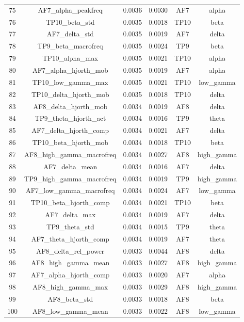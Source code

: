\begin{table}[hptb]
\begin{table}
\begin{tabular}{cccccc}
75 & AF7_alpha_peakfreq & 0.0036 & 0.0030 & AF7 & alpha \\
76 & TP10_beta_std & 0.0035 & 0.0018 & TP10 & beta \\
77 & AF7_delta_std & 0.0035 & 0.0019 & AF7 & delta \\
78 & TP9_beta_macrofreq & 0.0035 & 0.0024 & TP9 & beta \\
79 & TP10_alpha_max & 0.0035 & 0.0021 & TP10 & alpha \\
80 & AF7_alpha_hjorth_mob & 0.0035 & 0.0019 & AF7 & alpha \\
81 & TP10_low_gamma_max & 0.0035 & 0.0021 & TP10 & low_gamma \\
82 & TP10_delta_hjorth_mob & 0.0035 & 0.0018 & TP10 & delta \\
83 & AF8_delta_hjorth_mob & 0.0034 & 0.0019 & AF8 & delta \\
84 & TP9_theta_hjorth_act & 0.0034 & 0.0016 & TP9 & theta \\
85 & AF7_delta_hjorth_comp & 0.0034 & 0.0021 & AF7 & delta \\
86 & TP10_beta_hjorth_mob & 0.0034 & 0.0018 & TP10 & beta \\
87 & AF8_high_gamma_macrofreq & 0.0034 & 0.0027 & AF8 & high_gamma \\
88 & AF7_delta_mean & 0.0034 & 0.0016 & AF7 & delta \\
89 & TP9_high_gamma_macrofreq & 0.0034 & 0.0019 & TP9 & high_gamma \\
90 & AF7_low_gamma_macrofreq & 0.0034 & 0.0024 & AF7 & low_gamma \\
91 & TP10_beta_hjorth_comp & 0.0034 & 0.0021 & TP10 & beta \\
92 & AF7_delta_max & 0.0034 & 0.0019 & AF7 & delta \\
93 & TP9_theta_std & 0.0034 & 0.0015 & TP9 & theta \\
94 & AF7_theta_hjorth_comp & 0.0034 & 0.0019 & AF7 & theta \\
95 & AF8_delta_rel_power & 0.0033 & 0.0044 & AF8 & delta \\
96 & AF8_high_gamma_mean & 0.0033 & 0.0027 & AF8 & high_gamma \\
97 & AF7_alpha_hjorth_comp & 0.0033 & 0.0020 & AF7 & alpha \\
98 & AF8_high_gamma_max & 0.0033 & 0.0029 & AF8 & high_gamma \\
99 & AF8_beta_std & 0.0033 & 0.0018 & AF8 & beta \\
100 & AF8_low_gamma_mean & 0.0033 & 0.0022 & AF8 & low_gamma \\

\end{tabular}
\end{table}
\end{table}
